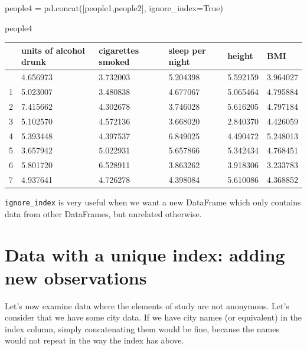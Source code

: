 \documentclass[
  letterpaper,
  DIV=11,
  numbers=noendperiod]{scrreprt}
\newenvironment{Shaded}{\begin{snugshade}}{\end{snugshade}}
\newcommand{\NormalTok}[1]{\textcolor[rgb]{0.00,0.23,0.31}{#1}}
\newcommand{\OperatorTok}[1]{\textcolor[rgb]{0.37,0.37,0.37}{#1}}
\newcommand{\VariableTok}[1]{\textcolor[rgb]{0.07,0.07,0.07}{#1}}
\begin{document}
\begin{Shaded}
\begin{Highlighting}[]
\NormalTok{people4 }\OperatorTok{=}\NormalTok{ pd.concat([people1,people2], ignore\_index}\OperatorTok{=}\VariableTok{True}\NormalTok{)}
\end{Highlighting}
\end{Shaded}

\begin{Shaded}
\begin{Highlighting}[]
\NormalTok{people4}
\end{Highlighting}
\end{Shaded}

\begin{longtable}[]{@{}llllll@{}}
\toprule\noalign{}
& units of alcohol drunk & cigarettes smoked & sleep per night & height
& BMI \\
\midrule\noalign{}
\endhead
\bottomrule\noalign{}
\endlastfoot
0 & 4.656973 & 3.732003 & 5.204398 & 5.592159 & 3.964027 \\
1 & 5.023007 & 3.480838 & 4.677067 & 5.065464 & 4.795884 \\
2 & 7.415662 & 4.302678 & 3.746028 & 5.616205 & 4.797184 \\
3 & 5.102570 & 4.572136 & 3.668020 & 2.840370 & 4.426059 \\
4 & 5.393448 & 4.397537 & 6.849025 & 4.490472 & 5.248013 \\
5 & 3.657942 & 5.022931 & 5.657866 & 5.342434 & 4.768451 \\
6 & 5.801720 & 6.528911 & 3.863262 & 3.918306 & 3.233783 \\
7 & 4.937641 & 4.726278 & 4.398084 & 5.610086 & 4.368852 \\
\end{longtable}

\texttt{ignore\_index} is very useful when we want a new DataFrame which
only contains data from other DataFrames, but unrelated otherwise.

\hypertarget{data-with-a-unique-index-adding-new-observations}{%
\section{Data with a unique index: adding new
observations}\label{data-with-a-unique-index-adding-new-observations}}

Let's now examine data where the elements of study are not anonymous.
Let's consider that we have some city data. If we have city names (or
equivalent) in the index column, simply concatenating them would be
fine, because the names would not repeat in the way the index has above.
\end{document}
